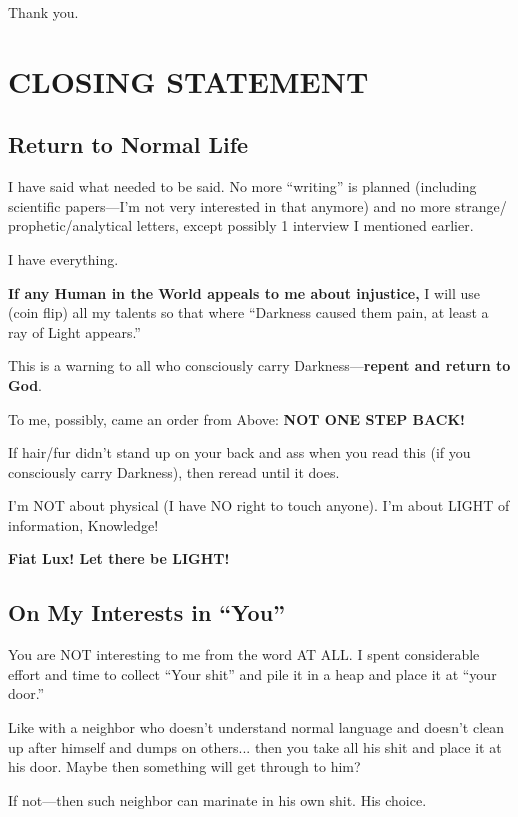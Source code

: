 \documentclass[11pt,a4paper]{article}
\theoremstyle{definition}
\theoremstyle{remark}
\begin{document}
Thank you.


\section{CLOSING STATEMENT}
\label{sec:closing}

\subsection{Return to Normal Life}

I have said what needed to be said. No more ``writing'' is planned (including 
scientific papers—I'm not very interested in that anymore) and no more strange/ 
prophetic/analytical letters, except possibly 1 interview I mentioned earlier.

I have everything.

\textbf{If any Human in the World appeals to me about injustice,} I will use (coin 
flip) all my talents so that where ``Darkness caused them pain, at least a ray of 
Light appears.''

This is a warning to all who consciously carry Darkness—\textbf{repent and return 
to God}.

To me, possibly, came an order from Above: \textbf{NOT ONE STEP BACK!}

If hair/fur didn't stand up on your back and ass when you read this (if you 
consciously carry Darkness), then reread until it does.

I'm NOT about physical (I have NO right to touch anyone). I'm about LIGHT of 
information, Knowledge!

\textbf{Fiat Lux! Let there be LIGHT!}

\subsection{On My Interests in ``You''}

You are NOT interesting to me from the word AT ALL. I spent considerable effort 
and time to collect ``Your shit'' and pile it in a heap and place it at ``your 
door.''

Like with a neighbor who doesn't understand normal language and doesn't clean up 
after himself and dumps on others... then you take all his shit and place it at 
his door. Maybe then something will get through to him?

If not—then such neighbor can marinate in his own shit. His choice.
\end{document}
